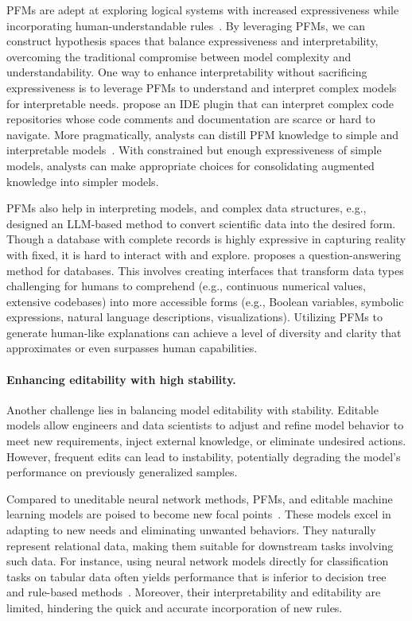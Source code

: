   PFMs are adept at exploring logical systems with increased expressiveness while incorporating human-under\-standable rules~\cite{reizingerposition}. By leveraging PFMs, we can construct hypothesis spaces that balance expressiveness and interpretability, overcoming the traditional compromise between model complexity and understandability. One way to enhance interpretability without sacrificing expressiveness is to leverage PFMs to understand and interpret complex models for interpretable needs. \cite{nam2024using} propose an IDE plugin that can interpret complex code repositories whose code comments and documentation are scarce or hard to navigate. More pragmatically, analysts can distill PFM knowledge to simple and interpretable models~\cite{singh2023augmenting}. With constrained but enough expressiveness of simple models, analysts can make appropriate choices for consolidating augmented knowledge into simpler models.
  
  PFMs also help in interpreting models, and complex data structures, e.g., \cite{ko2024filling} designed an LLM-based method to convert scientific data into the desired form. Though a database with complete records is highly expressive in capturing reality with fixed, it is hard to interact with and explore. \cite{zheng2024revolutionizing} proposes a question-answering method for databases. This involves creating interfaces that transform data types challenging for humans to comprehend (e.g., continuous numerical values, extensive codebases) into more accessible forms (e.g., Boolean variables, symbolic expressions, natural language descriptions, visualizations). Utilizing PFMs to generate human-like explanations can achieve a level of diversity and clarity that approximates or even surpasses human capabilities.
  
  \paragraph{Enhancing editability with high stability.}
  
  Another challenge lies in balancing model editability with stability. Editable models allow engineers and data scientists to adjust and refine model behavior to meet new requirements, inject external knowledge, or eliminate undesired actions. However, frequent edits can lead to instability, potentially degrading the model's performance on previously generalized samples.
  
  Compared to uneditable neural network methods, PFMs, and editable machine learning models are poised to become new focal points~\cite{vojivr2020editable}. These models excel in adapting to new needs and eliminating unwanted behaviors. They naturally represent relational data, making them suitable for downstream tasks involving such data. For instance, using neural network models directly for classification tasks on tabular data often yields performance that is inferior to decision tree and rule-based methods~\cite{popov2019neural,grinsztajn2022tree}. Moreover, their interpretability and editability are limited, hindering the quick and accurate incorporation of new rules.
  
